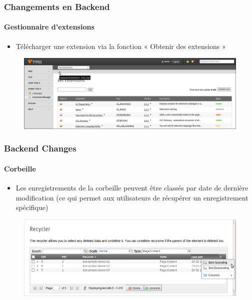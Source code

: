 
\begin{frame}[fragile]
	\frametitle{Changements en Backend}
	\framesubtitle{Gestionnaire d'extensions}

 	\begin{itemize}
		\item Télécharger une extension via la fonction « Obtenir des extensions »
	\end{itemize}

	\begin{figure}
		\includegraphics[width=0.95\linewidth]{Images/BackendChanges/UploadExtension.png}
	\end{figure}

\end{frame}


\begin{frame}[fragile]
	\frametitle{Backend Changes}
	\framesubtitle{Corbeille}

 	\begin{itemize}
		\item Les enregistrements de la corbeille peuvent être classés par date de dernière modification (ce qui permet aux utilisateurs de récupérer un enregistrement spécifique)
	\end{itemize}

	\begin{figure}
		\includegraphics[width=0.95\linewidth]{Images/BackendChanges/RecyclerSortRecord.png}
	\end{figure}

\end{frame}

